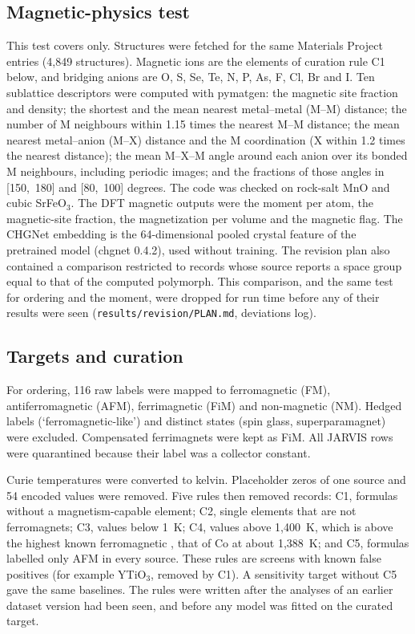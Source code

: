 \documentclass[11pt,a4paper]{article}
\begin{document}
\subsection*{Magnetic-physics test}
This test covers \Tc{} only. Structures were fetched for the same Materials Project entries (4,849 structures). Magnetic ions are the elements of curation rule C1 below, and bridging anions are O, S, Se, Te, N, P, As, F, Cl, Br and I. Ten sublattice descriptors were computed with pymatgen: the magnetic site fraction and density; the shortest and the mean nearest metal--metal (M--M) distance; the number of M neighbours within 1.15 times the nearest M--M distance; the mean nearest metal--anion (M--X) distance and the M coordination (X within 1.2 times the nearest distance); the mean M--X--M angle around each anion over its bonded M neighbours, including periodic images; and the fractions of those angles in [150,~180] and [80,~100] degrees. The code was checked on rock-salt MnO and cubic SrFeO$_3$. The DFT magnetic outputs were the moment per atom, the magnetic-site fraction, the magnetization per volume and the magnetic flag. The CHGNet embedding is the 64-dimensional pooled crystal feature of the pretrained model (chgnet 0.4.2), used without training. The revision plan also contained a comparison restricted to records whose source reports a space group equal to that of the computed polymorph. This comparison, and the same test for ordering and the moment, were dropped for run time before any of their results were seen (\texttt{results/revision/PLAN.md}, deviations log).

\subsection*{Targets and curation}
For ordering, 116 raw labels were mapped to ferromagnetic (FM), antiferromagnetic (AFM), ferrimagnetic (FiM) and non-magnetic (NM). Hedged labels (`ferromagnetic-like') and distinct states (spin glass, superparamagnet) were excluded. Compensated ferrimagnets were kept as FiM. All JARVIS rows were quarantined because their label was a collector constant.

Curie temperatures were converted to kelvin. Placeholder zeros of one source and 54 encoded values were removed. Five rules then removed records: C1, formulas without a magnetism-capable element; C2, single elements that are not ferromagnets; C3, values below 1~K; C4, values above 1,400~K, which is above the highest known ferromagnetic \Tc{}, that of Co at about 1,388~K\cite{coey2010magnetism}; and C5, formulas labelled only AFM in every source. These rules are screens with known false positives (for example YTiO$_3$, removed by C1). A sensitivity target without C5 gave the same baselines. The rules were written after the analyses of an earlier dataset version had been seen, and before any model was fitted on the curated target.
\end{document}
